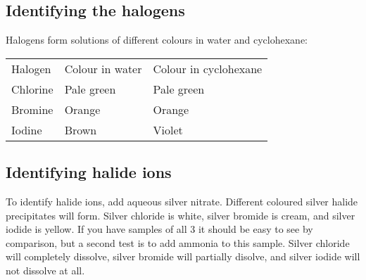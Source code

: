 \subsection{Identifying the halogens}
Halogens form solutions of different colours in water and cyclohexane:
\begin{table}[ht]
	\begin{tabular}{lll}
		Halogen  & Colour in water & Colour in cyclohexane \\
		Chlorine & Pale green      & Pale green            \\
		Bromine  & Orange          & Orange                \\
		Iodine   & Brown           & Violet               
	\end{tabular}
\end{table}

\subsection{Identifying halide ions}
To identify halide ions, add aqueous silver nitrate. Different coloured silver halide precipitates will form. Silver chloride is white, silver bromide is cream, and silver iodide is yellow. If you have samples of all 3 it should be easy to see by comparison, but a second test is to add ammonia to this sample. Silver chloride will completely dissolve, silver bromide will partially disolve, and silver iodide will not dissolve at all.
